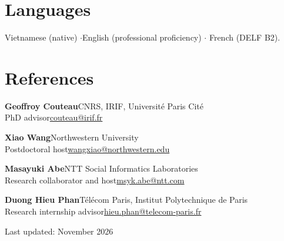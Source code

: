 \documentclass[11pt]{article}
\newcommand{\entry}[4]{%
  \needspace{3\baselineskip}%
  \noindent\textbf{#1}\hspace{1em}\hfill #2\\[0.15em]
  \noindent #3\hspace{1em}\hfill #4\par\vspace{0.45em}}
\begin{document}
\section{Languages}

Vietnamese (native) \quad$\cdot$\quad English (professional proficiency) \quad$\cdot$\quad
French (DELF B2).

\section{References}

\entry{Geoffroy Couteau}{CNRS, IRIF, Universit\'e Paris Cit\'e}
{PhD advisor}{\href{mailto:couteau@irif.fr}{couteau@irif.fr}}
\vspace{-0.5em}

\entry{Xiao Wang}{Northwestern University}
{Postdoctoral host}{\href{mailto:wangxiao@northwestern.edu}{wangxiao@northwestern.edu}}
\vspace{-0.5em}

\entry{Masayuki Abe}{NTT Social Informatics Laboratories}
{Research collaborator and host}{\href{mailto:msyk.abe@ntt.com}{msyk.abe@ntt.com}}
\vspace{-0.5em}

\entry{Duong Hieu Phan}{T\'el\'ecom Paris, Institut Polytechnique de Paris}
{Research internship advisor}{\href{mailto:hieu.phan@telecom-paris.fr}{hieu.phan@telecom-paris.fr}}

\vfill
{\small\hfill Last updated: November 2026}
\end{document}
